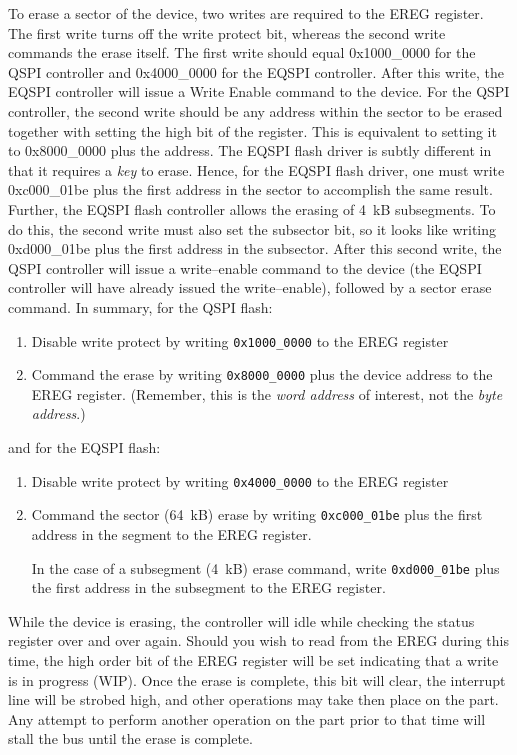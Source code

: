 \documentclass{gqtekspec}
\begin{document}
To erase a sector of the device, two writes are required to the EREG register.
The first write turns off the write protect bit, whereas the second write
commands the erase itself.  The first write should equal \hbox{0x1000\_0000}
for the QSPI controller and \hbox{0x4000\_0000} for the EQSPI controller.
After this write, the EQSPI controller will issue a Write Enable command to the
device.  For the QSPI controller, the second write should be any address within
the sector to be erased together with setting the high bit of the register. 
This is equivalent to setting it to \hbox{0x8000\_0000} plus the address.  The
EQSPI flash driver is subtly different in that it requires a {\em key} to erase.
Hence, for the EQSPI flash driver, one must write \hbox{0xc000\_01be} plus the
first address in the sector to accomplish the same result.  Further, the
EQSPI flash controller allows the erasing of 4~kB subsegments.  To do this,
the second write must also set the subsector bit, so it looks like writing
\hbox{0xd000\_01be} plus the first address in the subsector.  After
this second write, the QSPI controller will issue a write--enable
command to the device (the EQSPI controller will have already issued the
write--enable), followed by a sector erase command.  In summary, for the
QSPI flash:
\begin{enumerate}
\item Disable write protect by writing \hbox{\tt 0x1000\_0000} to the EREG
	register
\item Command the erase by writing \hbox{\tt 0x8000\_0000} plus the device
	address to the EREG register.  (Remember, this is the {\em word
	address} of interest, not the {\em byte address}.)
\end{enumerate}
and for the EQSPI flash:
\begin{enumerate}
\item Disable write protect by writing \hbox{\tt 0x4000\_0000} to the EREG
	register
\item Command the sector (64~kB) erase by writing \hbox{\tt 0xc000\_01be} plus
	the first address in the segment to the EREG register.

	In the case of a subsegment (4~kB) erase command, write
	\hbox{\tt 0xd000\_01be} plus the first address in the subsegment to
	the EREG register.
\end{enumerate}

While the device is erasing, the controller will idle while checking the
status register over and over again.  Should you wish to read from the EREG
during this time, the high order bit of the EREG register will be set indicating
that a write is in progress (WIP).  Once the erase is complete, this bit will
clear, the interrupt line will be strobed high, and other operations may take
then place on the part.  Any attempt to perform another operation on the part
prior to that time will stall the bus until the erase is complete.
\end{document}
